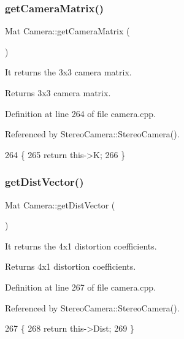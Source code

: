 \subsubsection{\texorpdfstring{get\+Camera\+Matrix()}{getCameraMatrix()}}
{\footnotesize\ttfamily Mat Camera\+::get\+Camera\+Matrix (\begin{DoxyParamCaption}{ }\end{DoxyParamCaption})}



It returns the 3x3 camera matrix. 

\begin{DoxyReturn}{Returns}
3x3 camera matrix. 
\end{DoxyReturn}


Definition at line 264 of file camera.\+cpp.



Referenced by Stereo\+Camera\+::\+Stereo\+Camera().


\begin{DoxyCode}
264                             \{
265     \textcolor{keywordflow}{return} this->K;
266 \}
\end{DoxyCode}
\mbox{\label{classCamera_a1cd15bc4fd4f0405c7e047af632b9353}} 
\subsubsection{\texorpdfstring{get\+Dist\+Vector()}{getDistVector()}}
{\footnotesize\ttfamily Mat Camera\+::get\+Dist\+Vector (\begin{DoxyParamCaption}{ }\end{DoxyParamCaption})}



It returns the 4x1 distortion coefficients. 

\begin{DoxyReturn}{Returns}
4x1 distortion coefficients. 
\end{DoxyReturn}


Definition at line 267 of file camera.\+cpp.



Referenced by Stereo\+Camera\+::\+Stereo\+Camera().


\begin{DoxyCode}
267                           \{
268     \textcolor{keywordflow}{return} this->Dist;
269 \}
\end{DoxyCode}
\mbox{\label{classCamera_a979043e0e738bf3858de6476e12b5a67}} 
